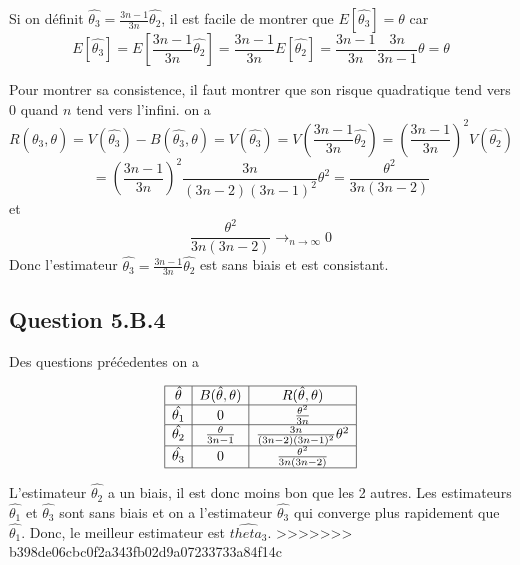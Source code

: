 \documentclass[]{book}
\theoremstyle{definition}
\begin{document}
Si on d\'efinit $\hat{\theta_3} = \frac{3n-1}{3n}\hat{\theta_2}$, il est facile de montrer que $E[\hat{\theta_3}] = \theta$ car 
$$
E[\hat{\theta_3}] = E\left[\frac{3n-1}{3n}\hat{\theta_2}\right] = \frac{3n-1}{3n}E[\hat{\theta_2}] = \frac{3n-1}{3n} \frac{3n}{3n-1} \theta = \theta
$$

Pour montrer sa consistence, il faut montrer que son risque quadratique tend vers 0 quand $n$ tend vers l'infini. on a 
$$
R(\hat{\theta_3},\theta) = V(\hat{\theta_3}) - B(\hat{\theta_3},\theta) = V(\hat{\theta_3}) = V\left(\frac{3n-1}{3n}\hat{\theta_2}\right) = \left(\frac{3n-1}{3n}\right)^2V(\hat{\theta_2})
$$
$$
= \left(\frac{3n-1}{3n}\right)^2\frac{3n}{(3n-2)(3n-1)^2}\theta^2 = \frac{\theta^2}{3n(3n-2)}
$$
et
$$
\frac{\theta^2}{3n(3n-2)} \to_{n \to \infty} 0
$$
Donc l'estimateur $\hat{\theta_3} = \frac{3n-1}{3n}\hat{\theta_2}$ est sans biais et est consistant.


\subsection*{Question 5.B.4}
Des questions pr\'e\'cedentes on a 

$$
\begin{array}{|c|c|c|}
    \hline
    \hat{\theta} & B(\hat{\theta},\theta) & R(\hat{\theta},\theta) \\
    \hline
    \hat{\theta_1} & 0 & \frac{\theta^2}{3n} \\
    \hline
    \hat{\theta_2} &  \frac{\theta}{3n-1} & \frac{3n}{(3n-2)(3n-1)^2}\theta^2 \\
    \hline
    \hat{\theta_3} & 0 & \frac{\theta^2}{3n(3n-2)} \\
    \hline
\end{array}
$$

L'estimateur $\hat{\theta_2}$ a un biais, il est donc moins bon que les 2 autres. Les estimateurs $\hat{\theta_1}$ et  $\hat{\theta_3}$ sont sans biais et on a l'estimateur $\hat{\theta_3}$ qui converge plus rapidement que $\hat{\theta_1}$. Donc, le meilleur estimateur est $\hat{theta_3}$.
>>>>>>> b398de06cbc0f2a343fb02d9a07233733a84f14c
\end{document}

